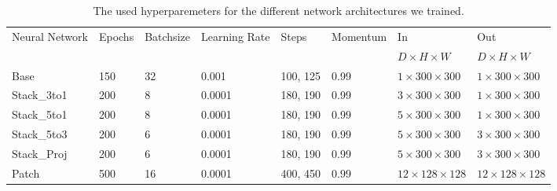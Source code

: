 \begin{sidewaystable}[htbp]
   \centering
   \caption[Hyperparameters]{The used hyperparemeters for the different network architectures we trained.}
   \begin{tabular}{l*{7}{l}}
      \toprule
      Neural Network & Epochs	& Batchsize & Learning Rate & Steps & Momentum & In & Out \\
      		&			&	&	&	&	& $D \times H \times W$	&  $D \times H \times W$	\\
      \midrule
      Base	& 150	& 32	& 0.001	& 100, 125 & 0.99	& $1 \times 300 \times 300$	& $1 \times 300 \times 300$ \\
      Stack\_3to1 & 200	& 8	& 0.0001 & 180, 190 & 0.99 & $3 \times 300 \times 300$ & $1 \times 300 \times 300$ \\
      Stack\_5to1 	& 200	& 8	& 0.0001 & 180, 190 & 0.99 & $5 \times 300 \times 300$ & $1 \times 300 \times 300$ \\
      Stack\_5to3 	& 200	& 6	& 0.0001 & 180, 190 & 0.99 & $5 \times 300 \times 300$ & $3 \times 300 \times 300$ \\
      Stack\_Proj & 200	& 6	& 0.0001 & 180, 190 & 0.99 & $5 \times 300 \times 300$ & $3 \times 300 \times 300$ \\
      Patch & 500	& 16	& 0.0001 & 400, 450 & 0.99 & $12 \times 128 \times 128$ & $12 \times 128 \times 128$ \\
      \bottomrule
   \end{tabular}
   \label{tab:hyperparameters}
\end{sidewaystable}




